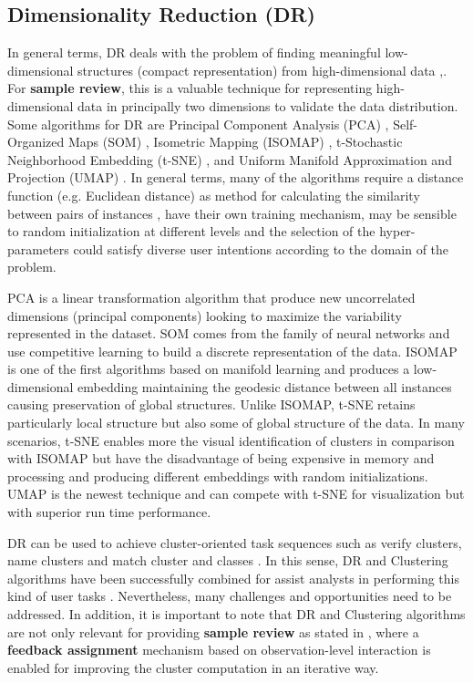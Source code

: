 \subsection{Dimensionality Reduction (DR)}
\label{subsection2.1.1}

In general terms, DR deals with the problem of finding meaningful low-dimensional structures (compact representation) from high-dimensional data \cite{Tenenbaum2000},\cite{Roweis2000}. For \textbf{sample review}, this is a valuable technique for representing high-dimensional data in principally two dimensions to validate the data distribution. Some algorithms for DR are Principal Component Analysis (PCA) \cite{PCA}, Self-Organized Maps (SOM) \cite{Kohonen1982Self-organizedMaps}, Isometric Mapping (ISOMAP) \cite{Tenenbaum2000}, t-Stochastic Neighborhood Embedding (t-SNE) \cite{VanDerMaaten2008}, and Uniform Manifold Approximation and Projection (UMAP) \cite{McInnes2018}. In general terms, many of the algorithms require a distance function (e.g. Euclidean distance) as method for calculating the similarity between pairs of instances \cite{Wenskovitch2018}, have their own training mechanism, may be sensible to random initialization at different levels and the selection of the hyper-parameters could satisfy diverse user intentions according to the domain of the problem.

PCA is a linear transformation algorithm that produce new uncorrelated dimensions (principal components) looking to maximize the variability represented in the dataset. SOM comes from the family of neural networks and use competitive learning to build a discrete representation of the data. ISOMAP is one of the first algorithms based on manifold learning and produces a low-dimensional embedding maintaining the geodesic distance between all instances causing preservation of global structures. Unlike ISOMAP, t-SNE retains particularly local structure but also some of global structure of the data. In many scenarios, t-SNE enables more the visual identification of clusters in comparison with ISOMAP but have the disadvantage of being expensive in  memory and processing and producing different embeddings with random initializations. UMAP is the newest technique and can compete with t-SNE for visualization but with superior run time performance.

DR can be used to achieve cluster-oriented task sequences such as verify clusters, name clusters and match cluster and classes \cite{Brehmer2014VisualizingSequences}. In this sense, DR and Clustering algorithms have been successfully combined for assist analysts in performing this kind of user tasks \cite{Wenskovitch2018}. Nevertheless, many challenges and opportunities need to be addressed. In addition, it is important to note that DR and Clustering algorithms are not only relevant for providing \textbf{sample review} as stated in \cite{Wenskovitch2017}, where a \textbf{feedback assignment} mechanism based on observation-level interaction is enabled for improving the cluster computation in an iterative way. 

